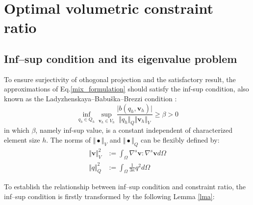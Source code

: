 \section{Optimal volumetric constraint ratio}\label{sec:constraint_ratio}
\subsection{Inf--sup condition and its eigenvalue problem}

To ensure surjectivity of othogonal projection and the satisfactory result, the approximations of Eq.\eqref{mix_formulation} should satisfy the inf-sup condition, also known as the Ladyzhenskaya–Babuška–Brezzi condition \cite{bathe1996}:
\begin{equation}\label{infsup}
    \inf_{q_h \in Q_h} \sup_{\boldsymbol v_h \in V_h} \frac{\vert b(q_h,\boldsymbol v_h) \vert}{\Vert q_h \Vert_Q \Vert \boldsymbol v_h \Vert_V} \ge \beta > 0
\end{equation}
in which $\beta$, namely inf-sup value, is a constant independent of characterized element size $h$.
The norms of $\Vert \bullet \Vert_V$ and $\Vert \bullet \Vert_Q$ can be flexibly defined by:
\begin{align}
    \label{norm_V}
    \Vert \boldsymbol v\Vert_V^2 &:= \int_\Omega \nabla^s \boldsymbol v : \nabla^s \boldsymbol v d\Omega \\
    \label{norm_Q}
    \Vert q \Vert_Q^2 &:= \int_\Omega \frac{1}{3\kappa}q^2 d\Omega
\end{align}


To establish the relationship between inf--sup condition and constraint ratio, the inf--sup condition is firstly transformed by the following Lemma \ref{lma}: 

